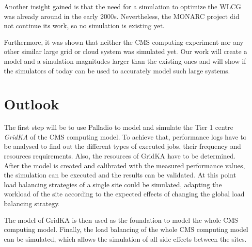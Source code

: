 Another insight gained is that the need for a simulation to optimize the WLCG was already around in the early 2000s. Nevertheless, the MONARC project did not continue its work, so no simulation is existing yet. 

Furthermore, it was shown that neither the CMS computing experiment nor any other similar large grid or cloud system was simulated yet. Our work will create a model and a simulation magnitudes larger than the existing ones and will show if the simulators of today can be used to accurately model such large systems.

\chapter{Outlook}
The first step will be to use Palladio to model and simulate the Tier 1 centre \textit{GridKA} of the CMS computing model. 
To achieve that, performance logs have to be analysed to find out the different types of executed jobs, 
their frequency and resources requirements. Also, the resources of GridKA have to be determined.
After the model is created and calibrated with the measured performance values, the simulation can be executed and the results can be validated.
At this point load balancing strategies of a single site could be simulated, adapting the workload of the site according to the expected effects of changing the global load balancing strategy.

The model of GridKA is then used as the foundation to model the whole CMS computing model. Finally, the load balancing of the whole CMS computing model can be simulated, which allows the simulation of all side effects between the sites.

